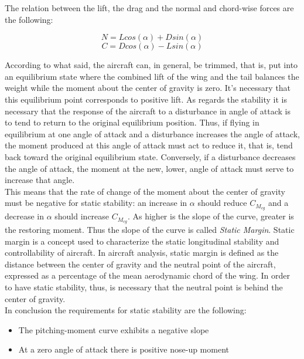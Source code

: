 The relation between the lift, the drag and the normal and chord-wise forces are the following:

\begin{equation}
N =L cos({\alpha}) + D sin({\alpha})
\end{equation}
\begin{equation}
C = D cos({\alpha}) - L sin({\alpha})
\end{equation}

According to what said, the aircraft can, in general, be trimmed, that is, put into an equilibrium state where the combined lift of the wing and the tail balances the weight while the moment about the center of gravity is zero. It's necessary that this equilibrium point corresponds to positive lift. As regards the stability it is necessary that the response of the aircraft to a disturbance in angle of attack is to tend to return to the original equilibrium position. Thus, if flying in equilibrium at one angle of attack and a disturbance increases the angle of attack, the moment produced at this angle of attack must act to reduce it, that is, tend back toward the original equilibrium state. Conversely, if a disturbance decreases the angle of attack, the moment at the new, lower, angle of attack must serve to increase that angle. \\
This means that the rate of change of the moment about the center of gravity must be negative for static stability: an increase in $\alpha$ should reduce $C_{M_{cg}}$ and a decrease in $\alpha$ should increase $C_{M_{cg}}$.\cite{sforza2014commercial} As higher is the   slope of the curve, greater is  the restoring moment. Thus the slope of the curve is called {\itshape Static Margin}.  Static margin is a concept used to characterize the static longitudinal stability and controllability of aircraft.
In aircraft analysis, static margin is defined as the distance between the center of gravity and the neutral point of the aircraft, expressed as a percentage of the mean aerodynamic chord of the wing.  In order to have static stability, thus, is necessary that the neutral point is behind the center of gravity.\\

In conclusion the requirements for static stability are the following:
\begin{itemize}
\item The pitching-moment curve exhibits a negative slope 
\item At a zero angle of attack there is positive nose-up moment
\end{itemize}

